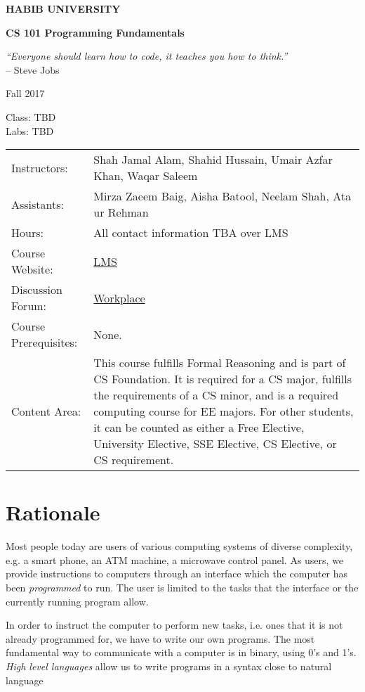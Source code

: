 \documentclass[a4paper]{article}
\begin{document}
\begin{center}

  {\LARGE\bf HABIB UNIVERSITY}\bigskip

  {\large\bf CS 101 Programming Fundamentals}\medskip

  {\it ``Everyone should learn how to code, it teaches you how to think.''}\\-- Steve Jobs\medskip

  Fall 2017\medskip
  
  Class: TBD\\
  Labs: TBD

\begin{tabular}{lp{}}
  Instructors:&  Shah Jamal Alam, Shahid Hussain, Umair Azfar Khan, Waqar Saleem \\
  Assistants:& Mirza Zaeem Baig, Aisha Batool, Neelam Shah, Ata ur Rehman\\
  Hours: & All contact information TBA over LMS\\
  Course Website:&  \href{https://lms.habib.edu.pk/}{LMS}\\
  Discussion Forum:& \href{https://habibedu.facebook.com/groups/1809008982742834/}{Workplace}\\
Course Prerequisites:&  None.\\
Content Area: & This course fulfills Formal Reasoning and is part of CS Foundation. It is required for a CS major, fulfills the requirements of a CS minor, and is a required computing course for EE majors. For other students, it can be counted as either a Free Elective, University Elective, SSE Elective, CS Elective, or CS requirement. 
\end{tabular}

\end{center}

\section{Rationale}

Most people today are users of various computing systems of diverse complexity, e.g. a smart phone, an ATM machine, a microwave control panel. As users, we provide instructions to computers through an interface which the computer has been {\it programmed} to run. The user is limited to the tasks that the interface or the currently running program allow.

In order to instruct the computer to perform new tasks, i.e. ones that it is not already programmed for, we have to write our own programs. The most fundamental way to communicate with a computer is in binary, using 0's and 1's. {\it High level languages} allow us to write programs in a syntax close to natural language 
\end{document}
